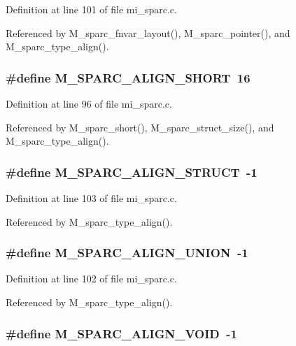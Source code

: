 Definition at line 101 of file mi\_\-sparc.c.

Referenced by M\_\-sparc\_\-fnvar\_\-layout(), M\_\-sparc\_\-pointer(), and M\_\-sparc\_\-type\_\-align().
\subsubsection{\setlength{\rightskip}{0pt plus 5cm}\#define M\_\-SPARC\_\-ALIGN\_\-SHORT~16}\label{mi__sparc_8c_5f18f0ce191d8bbd37aba9f452eb0192}




Definition at line 96 of file mi\_\-sparc.c.

Referenced by M\_\-sparc\_\-short(), M\_\-sparc\_\-struct\_\-size(), and M\_\-sparc\_\-type\_\-align().
\subsubsection{\setlength{\rightskip}{0pt plus 5cm}\#define M\_\-SPARC\_\-ALIGN\_\-STRUCT~-1}\label{mi__sparc_8c_84cbd64e41b7ced35a04769ec480c0c8}




Definition at line 103 of file mi\_\-sparc.c.

Referenced by M\_\-sparc\_\-type\_\-align().
\subsubsection{\setlength{\rightskip}{0pt plus 5cm}\#define M\_\-SPARC\_\-ALIGN\_\-UNION~-1}\label{mi__sparc_8c_0bb43402a7eadf28caa07ad0ef091d05}




Definition at line 102 of file mi\_\-sparc.c.

Referenced by M\_\-sparc\_\-type\_\-align().
\subsubsection{\setlength{\rightskip}{0pt plus 5cm}\#define M\_\-SPARC\_\-ALIGN\_\-VOID~-1}\label{mi__sparc_8c_e758d55d512c0e130c7afa0d68727a05}




